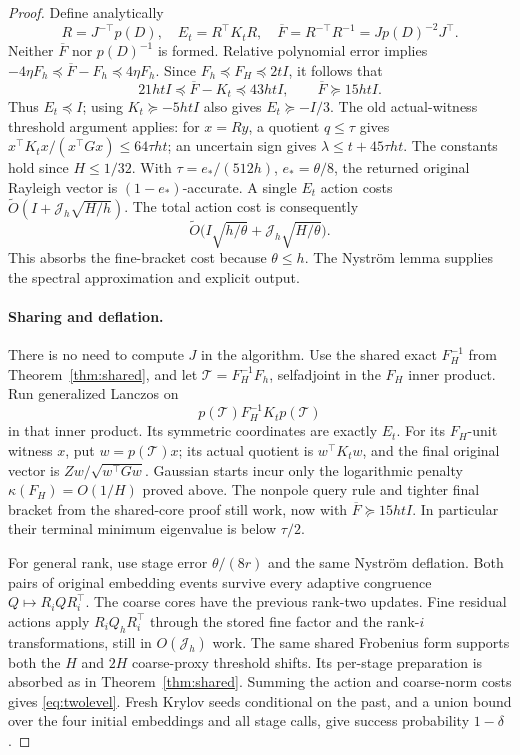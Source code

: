 \documentclass[11pt]{article}
\newcommand{\tO}{\widetilde O}
\begin{document}
\begin{proof}
Define analytically
\[
 R=J^{-\top}p(D),\quad E_t=R^\top K_tR,\quad
 \overline F=R^{-\top}R^{-1}=Jp(D)^{-2}J^\top .
\]
Neither \(\overline F\) nor \(p(D)^{-1}\) is formed. Relative polynomial
error implies
\(-4\eta F_h\preceq\overline F-F_h\preceq4\eta F_h\).
Since \(F_h\preceq F_H\preceq2tI\), it follows that
\[
 21htI\preceq\overline F-K_t\preceq43htI,\qquad
 \overline F\succeq15htI.
\]
Thus \(E_t\preceq I\); using \(K_t\succeq-5htI\) also gives
\(E_t\succeq-I/3\). The old actual-witness threshold argument applies:
for \(x=Ry\), a quotient \(q\leq\tau\) gives
\(x^\top K_tx/(x^\top Gx)\leq64\tau ht\); an uncertain sign gives
\(\lambda\leq t+45\tau ht\). The constants hold since \(H\leq1/32\).
With \(\tau=e_*/(512h)\), \(e_*=\theta/8\), the returned original
Rayleigh vector is \((1-e_*)\)-accurate. A single \(E_t\) action costs
\(\widetilde O(I+\mathcal J_h\sqrt{H/h})\).
The total action cost is consequently
\[
 \tO\bigl(I\sqrt{h/\theta}
                  +\mathcal J_h\sqrt{H/\theta}\bigr).
\]
This absorbs the fine-bracket cost because \(\theta\leq h\).
The Nystr\"om lemma supplies the spectral approximation and explicit output.

\paragraph{Sharing and deflation.}
There is no need to compute \(J\) in the algorithm. Use the shared exact
\(F_H^{-1}\) from Theorem~\ref{thm:shared}, and let
\(\mathcal T=F_H^{-1}F_h\), selfadjoint in the \(F_H\) inner product.
Run generalized Lanczos on
\[
 p(\mathcal T)F_H^{-1}K_t p(\mathcal T)
\]
in that inner product. Its symmetric coordinates are exactly \(E_t\).
For its \(F_H\)-unit witness \(x\), put \(w=p(\mathcal T)x\);
its actual quotient is \(w^\top K_tw\), and the final original
vector is \(Zw/\sqrt{w^\top Gw}\).
Gaussian starts incur only the logarithmic penalty
\(\kappa(F_H)=O(1/H)\) proved above.
The nonpole query rule and tighter final bracket from the shared-core
proof still work, now with \(\overline F\succeq15htI\).
In particular their terminal minimum eigenvalue is below \(\tau/2\).

For general rank, use stage error \(\theta/(8r)\) and the same
Nystr\"om deflation. Both pairs of original embedding events survive
every adaptive congruence \(Q\mapsto R_iQR_i^\top\).
The coarse cores have the previous rank-two updates. Fine residual
actions apply \(R_iQ_hR_i^\top\) through the stored fine factor and
the rank-\(i\) transformations, still in \(O(\mathcal J_h)\) work.
The same shared Frobenius form supports both the \(H\) and \(2H\)
coarse-proxy threshold shifts. Its per-stage preparation is absorbed
as in Theorem~\ref{thm:shared}. Summing the action and coarse-norm
costs gives \eqref{eq:twolevel}. Fresh Krylov seeds conditional on the
past, and a union bound over the four initial embeddings and all
stage calls, give success probability \(1-\delta\).
\end{proof}
\end{document}
